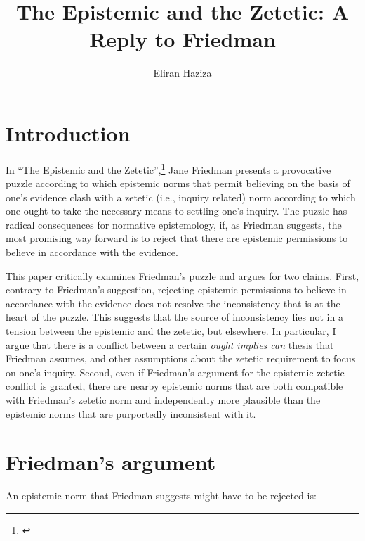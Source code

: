 \documentclass[12pt]{article}
\title{The Epistemic and the Zetetic: A Reply to Friedman}
\author{Eliran Haziza}
\begin{document}
\maketitle

\section{Introduction}

In ``The Epistemic and the Zetetic'',\footnote{\textcite{friedman_epistemic_nodate}} Jane Friedman presents a provocative puzzle according to which epistemic norms that permit believing on the basis of one's evidence clash with a zetetic (i.e., inquiry related) norm according to which one ought to take the necessary means to settling one's inquiry. The puzzle has radical consequences for normative epistemology, if, as Friedman suggests, the most promising way forward is to reject that there are epistemic permissions to believe in accordance with the evidence.

This paper critically examines Friedman's puzzle and argues for two claims. First, contrary to Friedman's suggestion, rejecting epistemic permissions to believe in accordance with the evidence does not resolve the inconsistency that is at the heart of the puzzle. This suggests that the source of inconsistency lies not in a tension between the epistemic and the zetetic, but elsewhere. In particular, I argue that there is a conflict between a certain \textit{ought implies can} thesis that Friedman assumes, and other assumptions about the zetetic requirement to focus on one's inquiry. Second, even if Friedman's argument for the epistemic-zetetic conflict is granted, there are nearby epistemic norms that are both compatible with Friedman's zetetic norm and independently more plausible than the epistemic norms that are purportedly inconsistent with it.

\section{Friedman's argument}\label{sec:2}

An epistemic norm that Friedman suggests might have to be rejected is:
\end{document}

